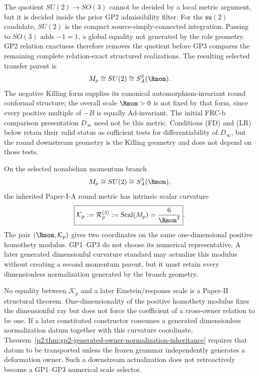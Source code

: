 \documentclass[12pt,a4paper]{article}
\begin{document}
The quotient \(SU(2)\to SO(3)\) cannot be decided by a local metric argument,
but it is decided inside the prior GP2 admissibility filter.  For the
\(\mathfrak{su}(2)\) candidate, \(SU(2)\) is the compact
source-simply-connected integration.  Passing to \(SO(3)\) adds \(-1=1\), a
global equality not generated by the role geometry.  GP2 relation exactness
therefore removes the quotient before GP3 compares the remaining complete
relation-exact structured realizations.
The resulting selected transfer parent is
\[
M_p\cong SU(2)\cong S^3_A(\Rmom).
\]
The negative Killing form supplies its canonical automorphism-invariant
round conformal structure; the overall scale \(\Rmom>0\) is not fixed by that
form, since every positive multiple of \(-B\) is equally Ad-invariant.  The initial FRC-b comparison presentation
\(D_\infty\) need not be this metric.  Conditions (FD) and (LR) below retain
their valid status as sufficient tests for differentiability of
\(D_\infty\), but the round downstream geometry is the Killing geometry and
does not depend on those tests.


\begin{corollary}
\label{p2:cor:v398-momentum-curvature-homothety}
On the selected nonabelian momentum branch
\[
 M_p\cong SU(2)\cong S^3_A(\Rmom),
\]
the inherited Paper-I-A round metric has intrinsic scalar curvature
\[
 \boxed{\mathcal K_p:=\mathcal R_p^{(3)}:=\operatorname{Scal}(M_p)=\frac6{\Rmom^2}}.
\]
The pair \((\Rmom,\mathcal K_p)\) gives two coordinates on the same
one-dimensional positive homothety modulus.  GP1--GP3 do not choose its
numerical representative.  A later generated dimensionful curvature standard
may actualize this modulus without creating a second momentum parent, but it
must retain every dimensionless normalization generated by the branch geometry.
\end{corollary}

\begin{remark}
\label{p2:rem:v398-momentum-curvature-firewall}
No equality between \(\mathcal K_p\) and a later Einstein/response scale is a
Paper-II structural theorem.  One-dimensionality of the positive homothety
modulus fixes the dimensionful ray but does not force the coefficient of a
cross-owner relation to be one.  If a later constituted constructor consumes
a generated dimensionless normalization datum together with this curvature
coordinate, Theorem~\ref{p2:thm:gp2-generated-owner-normalization-inheritance}
requires that datum to be transported unless the frozen grammar independently
generates a deformation owner.  Such a downstream actualization does not
retroactively become a GP1--GP3 numerical scale selector.
\end{remark}
\end{document}
